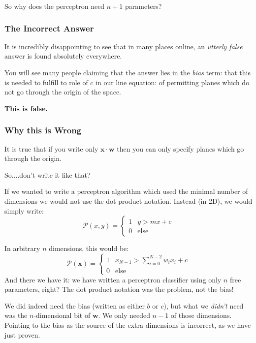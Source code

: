 \documentclass[a4paper,openany,11pt]{book}
\renewcommand\vec[1]{\boldsymbol{\mathbf{#1}}}
\begin{document}
					So why does the perceptron need $n+1$ parameters?
					
					\subsubsection{The Incorrect Answer}

						It is incredibly disappointing to see that in many places online, an \textit{utterly false} answer is found absolutely everywhere. 

						You will see many people claiming that the answer lies in the \textit{bias} term: that this is needed to fulfill to role of $c$ in our line equation: of permitting planes which do not go through the origin of the space. 

						\textbf{This is false.}

					\subsubsection{Why this is Wrong}

						It is true that if you write only $\vec{x} \cdot \vec{w}$ then you can only specify planes which go through the origin. 

						So....don't write it like that?

						If we wanted to write a perceptron algorithm which used the minimal number of dimensions we would not use the dot product notation. Instead (in 2D), we would simply write:
						\begin{equation}
							\mathcal{P}(x,y) = \begin{cases} 1 & y> mx + c \\ 0 &\text{else} \end{cases}
						\end{equation}

						In arbitrary $n$ dimensions, this would be:
						\begin{equation}
							\mathcal{P}(\vec{x})= \begin{cases} 1 & x_{N-1} > \sum_{i=0}^{N-2} w_i x_i + c \\ 0 & \text{else} \end{cases}
						\end{equation}
						And there we have it: we have written a perceptron classifier using only $n$ free parameters, right? The dot product notation was the problem, not the bias!
						
						We did indeed need the bias (written as either $b$ or $c$), but what we \textit{didn't} need was the $n$-dimensional bit of $\vec{w}$. We only needed $n-1$ of those dimensions. Pointing to the bias as the source of the extra dimensions is incorrect, as we have just proven.
\end{document}
